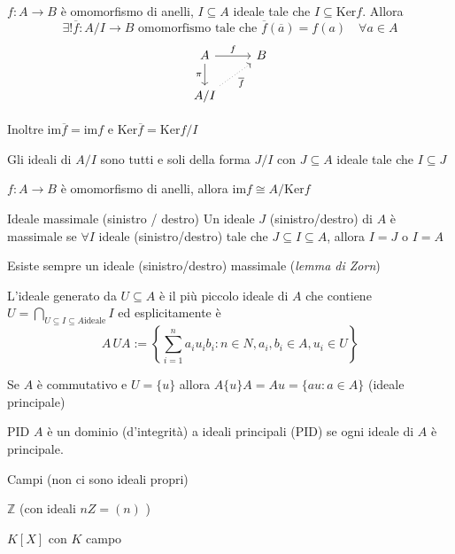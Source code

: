 \begin{theorem}[Omomorfismo]
    \(f : A\to B\) è omomorfismo di anelli, \(I \subseteq A \) ideale tale che
    \(I \subseteq \mathrm{Ker}f \). Allora
    \[
      \exists ! \overline{f} : A / I \to  B \text{ omomorfismo tale che } \overline{f}{(\overline{a})} = f{(a)} \quad \forall  a \in A
    \]
\[\begin{tikzcd}
	A & B \\
	{A / I}
	\arrow["f", from=1-1, to=1-2]
	\arrow["\pi"', from=1-1, to=2-1]
	\arrow["{\overline{f}}"', dotted, from=2-1, to=1-2]
\end{tikzcd}\]

Inoltre \(\mathrm{im}\overline{f} = \mathrm{im}f\) e \(\mathrm{Ker}\overline{f} = \mathrm{Ker} f / I\) 
\end{theorem}
\begin{proposition}{}
    Gli ideali di \(A / I\) sono tutti e soli della forma \(J / I\) con \(J \subseteq A \) ideale tale che \(I \subseteq J \) 
\end{proposition}


\begin{theorem}
    \(f : A \to B\) è omomorfismo di anelli, allora \(\mathrm{im}f \cong A / \mathrm{Ker}f\)  
\end{theorem}

\begin{definition}{Ideale massimale (sinistro / destro)}
    Un ideale \(J\) (sinistro/destro) di \(A\) è massimale se \(\forall I\) ideale
    (sinistro/destro) tale che \(J \subseteq I \subseteq A  \), allora \(I = J\) o \( I = A\) 
\end{definition}
\begin{remark}{}
    Esiste sempre un ideale (sinistro/destro) massimale (\emph{lemma di Zorn})
\end{remark}

\begin{definition}{}
    L'ideale generato da \(U \subseteq A \) è il più piccolo ideale di \(A\) che
    contiene \(U = \bigcap_{U \subseteq I \subseteq A \text{ideale}} I \) ed
    esplicitamente è 
    \[
      A\,UA := \left\{\sum_{i=1}^{n} a_{i} u_{i} b_{i} : n \in N, a_{i}, b_{i} \in A, u_{i} \in U \right\} 
    \]
\end{definition}
\begin{remark}{}
    Se \(A\) è commutativo e \(U = \{u\} \) allora \(A \{ u \} A = Au = \{au : a
    \in A\} \) (ideale principale)
\end{remark}
\begin{definition}{PID}
    \(A\) è un dominio (d'integrità) a ideali principali (PID) se ogni ideale di
    \(A\) è principale.
\end{definition}
\begin{example}{}
    Campi (non ci sono ideali propri)
\end{example}
\begin{example}{}
    \(\mathbb{Z}\) (con ideali \(nZ = (n)\) )
\end{example}
\begin{example}{}
    \(K[X]\) con \(K\) campo
\end{example}
